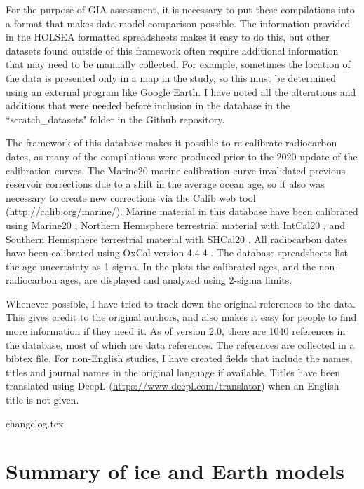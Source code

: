 \documentclass[a4paper,12pt]{article}
\begin{document}
For the purpose of GIA assessment, it is necessary to put these compilations into a format that makes data-model comparison possible. The information provided in the HOLSEA formatted spreadsheets makes it easy to do this, but other datasets found outside of this framework often require additional information that may need to be manually collected. For example, sometimes the location of the data is presented only in a map in the study, so this must be determined using an external program like Google Earth. I have noted all the alterations and additions that were needed before inclusion in the database in the ``scratch\_datasets" folder in the Github repository.

The framework of this database makes it possible to re-calibrate radiocarbon dates, as many of the compilations were produced prior to the 2020 update of the calibration curves. The Marine20 marine calibration curve \citep{HeatonEtal2020} invalidated previous reservoir corrections due to a shift in the average ocean age, so it also was necessary to create new corrections via the Calib web tool (\url{http://calib.org/marine/}). Marine material in this database have been calibrated using Marine20 \citep{HeatonEtal2020}, Northern Hemisphere terrestrial material with IntCal20 \citep{ReimerEtal2020}, and Southern Hemisphere terrestrial material with SHCal20 \citep{HoggEtal2020}. All radiocarbon dates have been calibrated using OxCal version 4.4.4 \citep{BronkRamsey2009}. The database spreadsheets list the age uncertainty as 1-sigma. In the plots the calibrated ages, and the non-radiocarbon ages, are displayed and analyzed using 2-sigma limits.


Whenever possible, I have tried to track down the original references to the data. This gives credit to the original authors, and also makes it easy for people to find more information if they need it. As of version 2.0, there are 1040 references in the database, most of which are data references. The references are collected in a bibtex file. For non-English studies, I have created fields that include the names, titles and journal names in the original language if available. Titles have been translated using DeepL (\url{https://www.deepl.com/translator}) when an English title is not given.



{changelog.tex}


\section{Summary of ice and Earth models}
\end{document}
